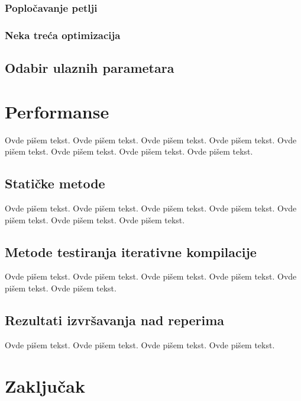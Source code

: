 \documentclass[a4paper]{article}
\begin{document}
{\subsubsection{Popločavanje petlji}
\subsubsection{Neka treća optimizacija}

\subsection{Odabir ulaznih parametara}



\section{Performanse}
\label{sec:performanse}


Ovde pišem tekst. 
Ovde pišem tekst. 
Ovde pišem tekst. 
Ovde pišem tekst. 
Ovde pišem tekst. 
Ovde pišem tekst. 
Ovde pišem tekst. 
Ovde pišem tekst. 


\subsection{Statičke metode}
\label{subsec:podnaslov1}

Ovde pišem tekst. 
Ovde pišem tekst. 
Ovde pišem tekst. 
Ovde pišem tekst. 
Ovde pišem tekst. 
Ovde pišem tekst. 
Ovde pišem tekst. 

\subsection{Metode testiranja iterativne kompilacije}
\label{subsec:podnaslov2}

Ovde pišem tekst. 
Ovde pišem tekst. 
Ovde pišem tekst. 
Ovde pišem tekst. 
Ovde pišem tekst. 
Ovde pišem tekst. 

\subsection{Rezultati izvršavanja nad reperima}
\label{subsec:podnaslov3}

Ovde pišem tekst. 
Ovde pišem tekst. 
Ovde pišem tekst. 
Ovde pišem tekst. 

\section{Zaključak}
\label{sec:zakljucak}

}
\end{document}

